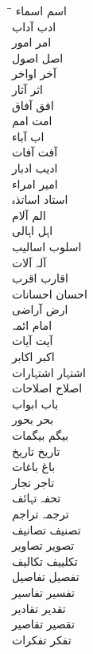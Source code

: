 \documentclass[a4paper]{article}
\begin{document}
\RTLmulticolcolumns
\fontsize{12pt}{12pt}\linespread{2.5}\notourdu
\setlength\columnsep{20pt}
\begin{multicols}{3}
\begin{tabbing}
\hspace*{2cm}\=\hspace*{2.5cm}\= \kill
اسم \> اسماء\\
ادب \> آداب\\
امر \> امور\\
اصل \> اصول\\
آخر \> اواخر\\
اثر \> آثار\\
افق \> آفاق\\
امت \> امم\\
اب \> آباء\\
آفت \> آفات\\
ادیب \> ادبار\\
امیر \> امراء\\
استاد \> اساتذہ\\
الم \> آلام\\
اہل \> اہالی\\
اسلوب \> اسالیب\\
آلہ \> آلات\\
اقارب \> اقرب\\
احسان \> احسانات\\
ارض \> آراضی\\
امام \> ائمہ\\
آیت \> آیات\\
اکبر \> اکابر\\
اشتہار \> اشتہارات\\
اصلاح \> اصلاحات\\
باب \> ابواب\\
بحر \> بحور\\
بیگم \> بیگمات\\
تاریخ \> تاریخ\\
باغ \> باغات\\
تاجر \> تجار\\
تحفہ \> تہائف\\
ترجمہ \> تراجم\\
تصنیف \> تصانیف\\
تصویر \> تصاویر\\
تکلییف \> تکالیف\\
تفصیل \> تفاصیل\\
تفسیر \> تفاسیر\\
تقدیر \> تقادیر\\
تقصیر \> تقاصیر\\
تفکر \> تفکرات\\

\end{tabbing}
\end{multicols}
\end{document}
